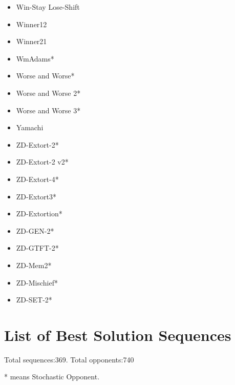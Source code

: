 \begin{appendices}
\begin{multicols}{4}
\begin{itemize}
            \item Win-Stay Lose-Shift
            \item Winner12
            \item Winner21
            \item WmAdams*
            \item Worse and Worse*
            \item Worse and Worse 2*
            \item Worse and Worse 3*
            \item Yamachi
            \item ZD-Extort-2*
            \item ZD-Extort-2 v2*
            \item ZD-Extort-4*
            \item ZD-Extort3*
            \item ZD-Extortion*
            \item ZD-GEN-2*
            \item ZD-GTFT-2*
            \item ZD-Mem2*
            \item ZD-Mischief*
            \item ZD-SET-2*
        \end{itemize}
    \end{multicols}

    \chapter{List of Best Solution Sequences}\label{apndx:solutionGroups}
    Total sequences:369. Total opponents:740

    * means Stochastic Opponent.


\end{appendices}
